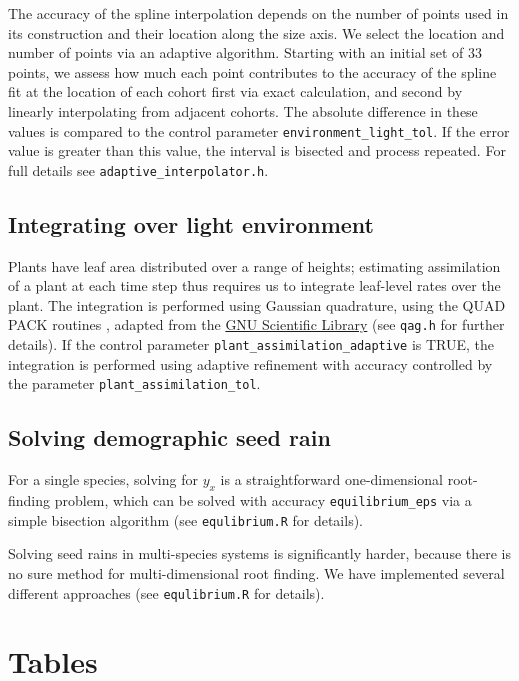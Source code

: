 \documentclass[10pt,twoside]{article}
\begin{document}
The accuracy of the spline interpolation depends on the number of points
used in its construction and their location along the size axis. We
select the location and number of points via an adaptive algorithm.
Starting with an initial set of 33 points, we assess how much each point
contributes to the accuracy of the spline fit at the location of each
cohort first via exact calculation, and second by linearly interpolating
from adjacent cohorts. The absolute difference in these values is
compared to the control parameter \texttt{environment\_light\_tol}. If
the error value is greater than this value, the interval is bisected and
process repeated. For full details see
\texttt{adaptive\_interpolator.h}.

\subsection{Integrating over light
environment}\label{integrating-over-light-environment}

Plants have leaf area distributed over a range of heights; estimating
assimilation of a plant at each time step thus requires us to integrate
leaf-level rates over the plant. The integration is performed using
Gaussian quadrature, using the QUAD PACK routines \citep{Piessens-1983},
adapted from the \href{http://www.gnu.org/software/gsl/}{GNU Scientific
Library}\citep{Galassi-2009} (see \texttt{qag.h} for further details).
If the control parameter \texttt{plant\_assimilation\_adaptive} is TRUE,
the integration is performed using adaptive refinement with accuracy
controlled by the parameter \texttt{plant\_assimilation\_tol}.

\subsection{Solving demographic seed
rain}\label{solving-demographic-seed-rain}

For a single species, solving for \(y_x\) is a straightforward
one-dimensional root-finding problem, which can be solved with accuracy
\texttt{equilibrium\_eps} via a simple bisection algorithm (see 
\texttt{equlibrium.R} for details). 

Solving seed rains in multi-species systems is significantly harder,
because there is no sure method for multi-dimensional root finding. We
have implemented several different approaches (see 
\texttt{equlibrium.R} for details).


\clearpage

\section{Tables}\label{tables}
\end{document}
